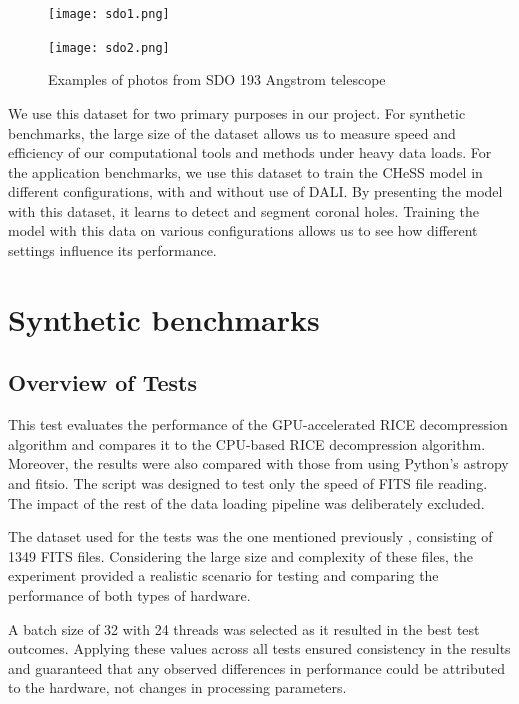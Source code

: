 \documentclass[licencjacka,en]{pracamgr}
\begin{document}
\begin{figure}[h]
    \vspace{1cm} 
    \centering
    \begin{minipage}{.45\textwidth}
        \centering
        \texttt{[image: sdo1.png]}
    \end{minipage}\hfill
    \begin{minipage}{.45\textwidth}
        \centering
        \texttt{[image: sdo2.png]}
    \end{minipage}
    \caption{Examples of photos from SDO 193 Angstrom telescope \cite{sdo-photos}}
    \label{fits_photo}
\end{figure}

We use this dataset for two primary purposes in our project. For synthetic benchmarks, the large size of the dataset allows us to measure speed and efficiency of our computational tools and methods under heavy data loads. For the application benchmarks, we use this dataset to train the CHeSS model \cite{CHeSS} in different configurations, with and without use of DALI. By presenting the model with this dataset, it learns to detect and segment coronal holes. Training the model with this data on various configurations allows us to see how different settings influence its performance.

\section{\label{benchmark}Synthetic benchmarks}
\subsection{Overview of Tests}
This test evaluates the performance of the GPU-accelerated RICE decompression algorithm and compares it to the CPU-based RICE decompression algorithm. Moreover, the results were also compared with those from using Python's astropy and fitsio. The script was designed to test only the speed of FITS file reading. The impact of the rest of the data loading pipeline was deliberately excluded.

The dataset used for the tests was the one mentioned previously \cite{sdo}, consisting of 1349 FITS files. Considering the large size and complexity of these files, the experiment provided a realistic scenario for testing and comparing the performance of both types of hardware.

A batch size of 32 with 24 threads was selected as it resulted in the best test outcomes. Applying these values across all tests ensured consistency in the results and guaranteed that any observed differences in performance could be attributed to the hardware, not changes in processing parameters.
\end{document}
